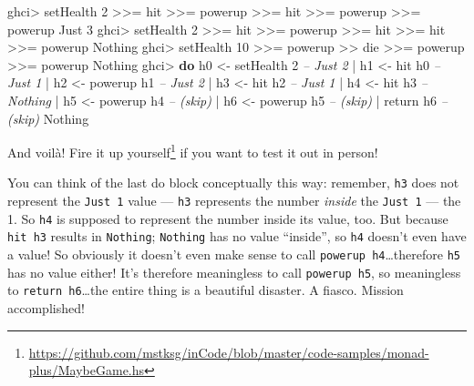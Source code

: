 \documentclass[]{article}
\newenvironment{Shaded}{}{}
\newcommand{\CommentTok}[1]{\textcolor[rgb]{0.38,0.63,0.69}{\textit{#1}}}
\newcommand{\DataTypeTok}[1]{\textcolor[rgb]{0.56,0.13,0.00}{#1}}
\newcommand{\DecValTok}[1]{\textcolor[rgb]{0.25,0.63,0.44}{#1}}
\newcommand{\FunctionTok}[1]{\textcolor[rgb]{0.02,0.16,0.49}{#1}}
\newcommand{\KeywordTok}[1]{\textcolor[rgb]{0.00,0.44,0.13}{\textbf{#1}}}
\newcommand{\NormalTok}[1]{#1}
\newcommand{\OtherTok}[1]{\textcolor[rgb]{0.00,0.44,0.13}{#1}}
\renewcommand{\href}[2]{#2\footnote{\url{#1}}}
\begin{document}
\begin{Shaded}
\begin{Highlighting}[]
\NormalTok{ghci}\FunctionTok{>}\NormalTok{ setHealth }\DecValTok{2} \FunctionTok{>>=}\NormalTok{ hit }\FunctionTok{>>=}\NormalTok{ powerup }\FunctionTok{>>=}\NormalTok{ hit }\FunctionTok{>>=}\NormalTok{ powerup }\FunctionTok{>>=}\NormalTok{ powerup}
\DataTypeTok{Just} \DecValTok{3}
\NormalTok{ghci}\FunctionTok{>}\NormalTok{ setHealth }\DecValTok{2} \FunctionTok{>>=}\NormalTok{ hit }\FunctionTok{>>=}\NormalTok{ powerup }\FunctionTok{>>=}\NormalTok{ hit }\FunctionTok{>>=}\NormalTok{ hit }\FunctionTok{>>=}\NormalTok{ powerup}
\DataTypeTok{Nothing}
\NormalTok{ghci}\FunctionTok{>}\NormalTok{ setHealth }\DecValTok{10} \FunctionTok{>>=}\NormalTok{ powerup }\FunctionTok{>>}\NormalTok{ die }\FunctionTok{>>=}\NormalTok{ powerup }\FunctionTok{>>=}\NormalTok{ powerup}
\DataTypeTok{Nothing}
\NormalTok{ghci}\FunctionTok{>} \KeywordTok{do}\NormalTok{  h0 }\OtherTok{<-}\NormalTok{ setHealth }\DecValTok{2}        \CommentTok{-- Just 2}
    \FunctionTok{|}\NormalTok{     h1 }\OtherTok{<-}\NormalTok{ hit h0             }\CommentTok{-- Just 1}
    \FunctionTok{|}\NormalTok{     h2 }\OtherTok{<-}\NormalTok{ powerup h1         }\CommentTok{-- Just 2}
    \FunctionTok{|}\NormalTok{     h3 }\OtherTok{<-}\NormalTok{ hit h2             }\CommentTok{-- Just 1}
    \FunctionTok{|}\NormalTok{     h4 }\OtherTok{<-}\NormalTok{ hit h3             }\CommentTok{-- Nothing}
    \FunctionTok{|}\NormalTok{     h5 }\OtherTok{<-}\NormalTok{ powerup h4         }\CommentTok{-- (skip)}
    \FunctionTok{|}\NormalTok{     h6 }\OtherTok{<-}\NormalTok{ powerup h5         }\CommentTok{-- (skip)}
    \FunctionTok{|}\NormalTok{     return h6                }\CommentTok{-- (skip)}
\DataTypeTok{Nothing}
\end{Highlighting}
\end{Shaded}

And voilà!
\href{https://github.com/mstksg/inCode/blob/master/code-samples/monad-plus/MaybeGame.hs}{Fire
it up yourself} if you want to test it out in person!

You can think of the last do block conceptually this way: remember, \texttt{h3}
does not represent the \texttt{Just\ 1} value --- \texttt{h3} represents the
number \emph{inside} the \texttt{Just\ 1} --- the 1. So \texttt{h4} is supposed
to represent the number inside its value, too. But because \texttt{hit\ h3}
results in \texttt{Nothing}; \texttt{Nothing} has no value ``inside'', so
\texttt{h4} doesn't even have a value! So obviously it doesn't even make sense
to call \texttt{powerup\ h4}\ldots{}therefore \texttt{h5} has no value either!
It's therefore meaningless to call \texttt{powerup\ h5}, so meaningless to
\texttt{return\ h6}\ldots{}the entire thing is a beautiful disaster. A fiasco.
Mission accomplished!
\end{document}
